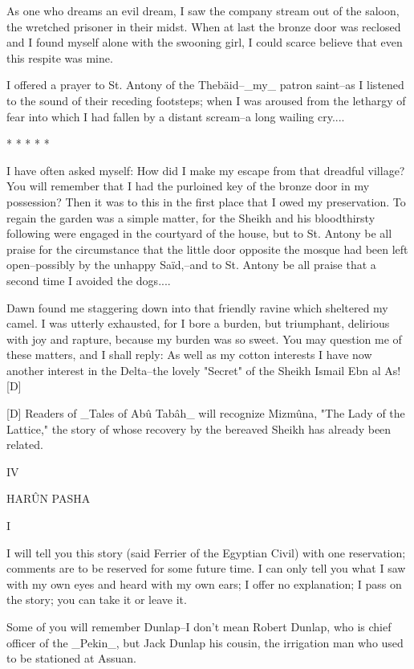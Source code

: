 As one who dreams an evil dream, I saw the company stream out of the
saloon, the wretched prisoner in their midst. When at last the bronze
door was reclosed and I found myself alone with the swooning girl, I
could scarce believe that even this respite was mine.

I offered a prayer to St. Antony of the Thebäid--_my_ patron saint--as
I listened to the sound of their receding footsteps; when I was
aroused from the lethargy of fear into which I had fallen by a distant
scream--a long wailing cry....

       *       *       *       *       *

I have often asked myself: How did I make my escape from that dreadful
village? You will remember that I had the purloined key of the bronze
door in my possession? Then it was to this in the first place that I
owed my preservation. To regain the garden was a simple matter, for
the Sheikh and his bloodthirsty following were engaged in the
courtyard of the house, but to St. Antony be all praise for the
circumstance that the little door opposite the mosque had been left
open--possibly by the unhappy Saïd,--and to St. Antony be all praise
that a second time I avoided the dogs....

Dawn found me staggering down into that friendly ravine which
sheltered my camel. I was utterly exhausted, for I bore a burden, but
triumphant, delirious with joy and rapture, because my burden was so
sweet. You may question me of these matters, and I shall reply: As well
as my cotton interests I have now another interest in the Delta--the
lovely "Secret" of the Sheikh Ismail Ebn al As![D]

  [D] Readers of _Tales of Abû Tabâh_ will recognize Mizmûna,
      "The Lady of the Lattice," the story of whose recovery
      by the bereaved Sheikh has already been related.




IV

HARÛN PASHA


I

I will tell you this story (said Ferrier of the Egyptian Civil) with
one reservation; comments are to be reserved for some future time. I
can only tell you what I saw with my own eyes and heard with my own
ears; I offer no explanation; I pass on the story; you can take it or
leave it.

Some of you will remember Dunlap--I don't mean Robert Dunlap, who is
chief officer of the _Pekin_, but Jack Dunlap his cousin, the
irrigation man who used to be stationed at Assuan.

